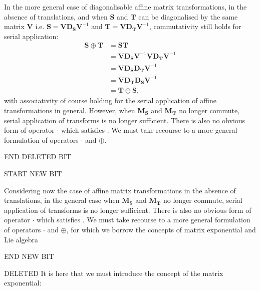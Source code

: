        In the more general case of diagonalisable affine matrix transformations, in the absence of translations, and when $\mathbf{S}$ and $\mathbf{T}$ can be diagonalised by the same matrix $\mathbf{V}$ i.e. $\mathbf{S} = \mathbf{VD_SV}^{-1}$ and $\mathbf{T} = \mathbf{VD_TV}^{-1}$, commutativity still holds for serial application:
            \begin{equation}
                \begin{split}
                   \mathbf{S} \oplus \mathbf{T} &= \mathbf{ST} \\
                                                 &= \mathbf{VD_SV}^{-1}\mathbf{VD_TV}^{-1} \\
                                                 &= \mathbf{VD_SD_TV}^{-1} \\
                                                 &= \mathbf{VD_TD_SV}^{-1} \\
                                                 &= \mathbf{T} \oplus \mathbf{S},
                \end{split}
            \end{equation}
            with associativity of course holding for the serial application of affine transformations in general. However, when $\mathbf{M_S}$ and $\mathbf{M_T}$ no longer commute, serial application of transforms is no longer sufficient. There is also no obvious form of operator $\cdot$ which satisfies . We must take recourse to a more general formulation of operators $\cdot$ and $\oplus$.
    
    
    
    
    END DELETED BIT
    
    START NEW BIT
    
		Considering now the case of affine matrix transformations in the absence of translations, in the general case when $\mathbf{M_S}$ and $\mathbf{M_T}$ no longer commute, serial application of transforms is no longer sufficient. There is also no obvious form of operator $\cdot$ which satisfies . We must take recourse to a more general formulation of operators $\cdot$ and $\oplus$, for which we borrow the concepts of matrix exponential and Lie algebra \cite{Arsigny2005, Arsigny2005a}

    END NEW BIT
        
    DELETED It is here that we must introduce the concept of the matrix exponential:

